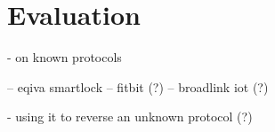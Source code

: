 
\chapter{Evaluation}\label{ch:evaluation}
\glsresetall %


- on known protocols

-- eqiva smartlock
-- fitbit (?)
-- broadlink iot (?)


- using it to reverse an unknown protocol (?)




